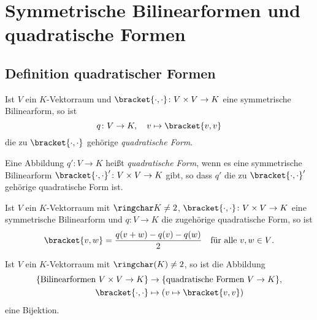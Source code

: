 \section{Symmetrische Bilinearformen und quadratische Formen}










\subsection{Definition quadratischer Formen}


\begin{definition}
  Ist $V$ ein $K$-Vektorraum und $\bracket{\cdot, \cdot} \colon V \times V \to K$ eine symmetrische Bilinearform, so ist
  \[
    q \colon V \to K,
    \quad
    v \mapsto \bracket{v, v}
  \]
  die zu $\bracket{\cdot, \cdot}$ gehörige \emph{quadratische Form}.
  
  Eine Abbildung $q' \colon V \to K$ heißt \emph{quadratische Form}, wenn es eine symmetrische Bilinearform $\bracket{\cdot, \cdot}' \colon V \times V \to K$ gibt, so dass $q'$ die zu $\bracket{\cdot, \cdot}'$ gehörige quadratische Form ist.
\end{definition}


\begin{lemma}
  Ist $V$ ein $K$-Vektorraum mit $\ringchar K \neq 2$, $\bracket{\cdot, \cdot} \colon V \times V \to K$ eine symmetrische Bilinearform und $q \colon V \to K$ die zugehörige quadratische Form, so ist
  \[
    \bracket{v, w} = \frac{q(v+w)-q(v)-q(w)}{2}
    \quad
    \text{für alle $v, w \in V$}.
  \]
\end{lemma}


\begin{corollary}
  Ist $V$ ein $K$-Vektorraum mit $\ringchar(K) \neq 2$, so ist die Abbildung
  \begin{align*}
    \{ \text{Bilinearformen $V \times V \to K$} \}
    &\to
    \{ \text{quadratische Formen $V \to K$} \},
    \\
    \bracket{\cdot, \cdot}
    &\mapsto
    (v \mapsto \bracket{v,v})
  \end{align*}
  eine Bijektion.
\end{corollary}


